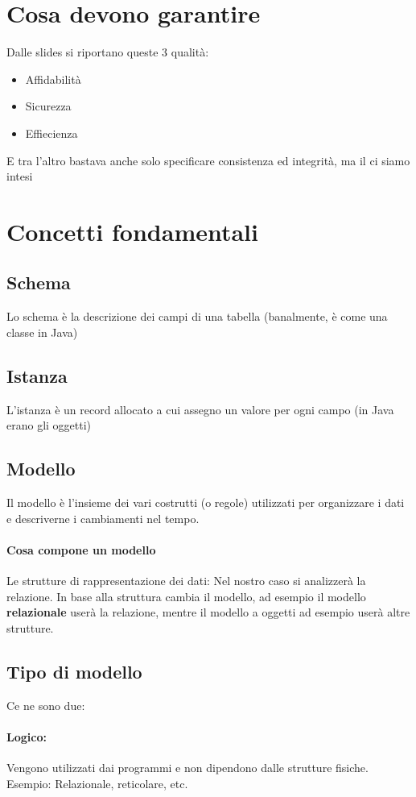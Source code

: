 \documentclass[12pt, a4paper, openany, twoside]{book}
\begin{document}
\section{Cosa devono garantire}
Dalle slides si riportano queste 3 qualità:
\begin{itemize}
	\item Affidabilità
	\item Sicurezza
	\item Effiecienza
\end{itemize}
E tra l'altro bastava anche solo specificare consistenza ed integrità, ma il 
ci siamo intesi
\section{Concetti fondamentali}
\subsection{Schema}
Lo schema è la descrizione dei campi di una tabella (banalmente, è come una 
classe in Java)
\subsection{Istanza}
L'istanza è un record allocato a cui assegno un valore per ogni campo (in Java
erano gli oggetti)
\subsection{Modello}
Il modello è l'insieme dei vari costrutti (o regole) utilizzati per organizzare
i dati e descriverne i cambiamenti nel tempo. 
\paragraph{Cosa compone un modello}
Le strutture di rappresentazione dei dati: Nel nostro caso si analizzerà 
la relazione. In base alla struttura cambia il modello, ad esempio il modello
\textbf{relazionale} userà la relazione, mentre il modello a oggetti ad esempio
userà altre strutture.
\subsection{Tipo di modello}
Ce ne sono due:
\paragraph{Logico:} Vengono utilizzati dai programmi e non dipendono
dalle strutture fisiche. Esempio: Relazionale, reticolare, etc.
\end{document}
